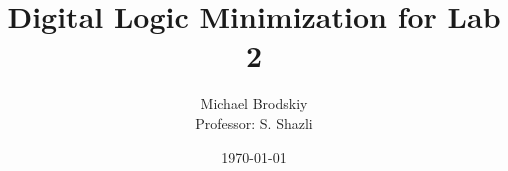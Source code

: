 


\pagestyle{fancy}

\title{Digital Logic Minimization for Lab 2}
\date{\today}
\author{Michael Brodskiy\\ \small Professor: S. Shazli}



\maketitle

\thispagestyle{fancy}

\newpage

